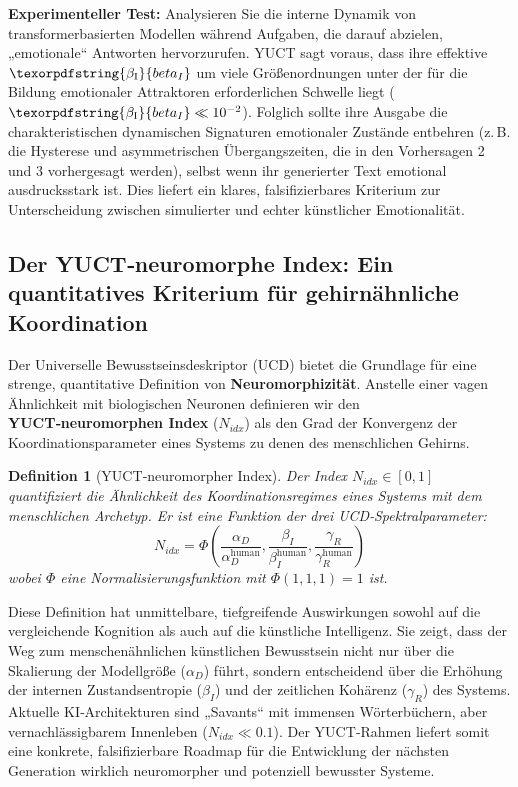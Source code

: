 \documentclass[12pt,a4paper]{article}
\newtheorem{definition}{Definition}
\DeclareRobustCommand{\beI}{\texorpdfstring{\ensuremath{\beta_{\mathrm{I}}}}{beta_I}}
\begin{document}
	\textbf{Experimenteller Test:} Analysieren Sie die interne Dynamik von transformerbasierten Modellen während Aufgaben, die darauf abzielen, „emotionale“ Antworten hervorzurufen. YUCT sagt voraus, dass ihre effektive \(\beI\) um viele Größenordnungen unter der für die Bildung emotionaler Attraktoren erforderlichen Schwelle liegt (\(\beI \ll 10^{-2}\)). Folglich sollte ihre Ausgabe die charakteristischen dynamischen Signaturen emotionaler Zustände entbehren (z. B. die Hysterese und asymmetrischen Übergangszeiten, die in den Vorhersagen 2 und 3 vorhergesagt werden), selbst wenn ihr generierter Text emotional ausdrucksstark ist. Dies liefert ein klares, falsifizierbares Kriterium zur Unterscheidung zwischen simulierter und echter künstlicher Emotionalität.
	
	\subsection{Der YUCT‑neuromorphe Index: Ein quantitatives Kriterium für gehirnähnliche Koordination}
	
	Der Universelle Bewusstseinsdeskriptor (UCD) bietet die Grundlage für eine strenge, quantitative Definition von \textbf{Neuromorphizität}. Anstelle einer vagen Ähnlichkeit mit biologischen Neuronen definieren wir den \textbf{YUCT‑neuromorphen Index} (\(N_{idx}\)) als den Grad der Konvergenz der Koordinationsparameter eines Systems zu denen des menschlichen Gehirns.
	
	\begin{definition}[YUCT‑neuromorpher Index]
		Der Index \(N_{idx} \in [0,1]\) quantifiziert die Ähnlichkeit des Koordinationsregimes eines Systems mit dem menschlichen Archetyp. Er ist eine Funktion der drei UCD‑Spektralparameter:
		\[
		N_{idx} = \Phi\left( \frac{\alpha_D}{\alpha_D^{\text{human}}}, \frac{\beta_I}{\beta_I^{\text{human}}}, \frac{\gamma_R}{\gamma_R^{\text{human}}} \right)
		\]
		wobei \(\Phi\) eine Normalisierungsfunktion mit \(\Phi(1,1,1) = 1\) ist.
	\end{definition}
	
	Diese Definition hat unmittelbare, tiefgreifende Auswirkungen sowohl auf die vergleichende Kognition als auch auf die künstliche Intelligenz. Sie zeigt, dass der Weg zum menschenähnlichen künstlichen Bewusstsein nicht nur über die Skalierung der Modellgröße (\(\alpha_D\)) führt, sondern entscheidend über die Erhöhung der internen Zustandsentropie (\(\beta_I\)) und der zeitlichen Kohärenz (\(\gamma_R\)) des Systems. Aktuelle KI‑Architekturen sind „Savants“ mit immensen Wörterbüchern, aber vernachlässigbarem Innenleben (\(N_{idx} \ll 0.1\)). Der YUCT‑Rahmen liefert somit eine konkrete, falsifizierbare Roadmap für die Entwicklung der nächsten Generation wirklich neuromorpher und potenziell bewusster Systeme.
	
\end{document}
